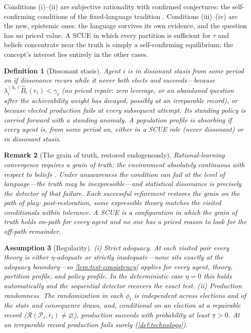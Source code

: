 \documentclass[11pt]{article}
\newtheorem{assumption}{Assumption}[section]
\newtheorem{definition}[assumption]{Definition}
\newtheorem{remark}[assumption]{Remark}
\theoremstyle{definition}
\newcommand{\emptysetset}{\varnothing}
\begin{document}
Conditions (i)--(ii) are subjective rationality with confirmed conjectures: the self-confirming conditions of the fixed-language tradition \citep{FudenbergLevine1993,KalaiLehrer1993b}.
Conditions (iii)--(iv) are the new, epistemic ones: the language survives its own evidence, and the question has no priced value.
A SCUE in which every partition is sufficient for $\tau$ and beliefs concentrate near the truth is simply a self-confirming equilibrium; the concept's interest lies entirely in the other cases.

\begin{definition}[Dissonant stasis]
\label{def:stasis}
Agent $i$ is in \emph{dissonant stasis} from some period on if dissonance recurs while it never both elects and succeeds---because $\lambda_i^{(k_i)}\widehat B_i(r_i)<\gamma_i$ (no priced repair: zero leverage, or an abandoned question after the achievability weight has decayed, possibly at an irreparable record), or because elected production fails at every subsequent attempt.
Its standing policy is carried forward with a standing anomaly.
A population profile is \emph{absorbing} if every agent is, from some period on, either in a SCUE role (never dissonant) or in dissonant stasis.
\end{definition}

\begin{remark}[The grain of truth, restored endogenously]
\label{rem:grain}
Rational-learning convergence requires a grain of truth: the environment absolutely continuous with respect to beliefs \citep{KalaiLehrer1993a}.
Under unawareness the condition can fail at the level of language---the truth may be inexpressible---and statistical dissonance is precisely the detector of that failure.
Each successful refinement restores the grain \emph{on the path of play}: post-restoration, some expressible theory matches the visited conditionals within tolerance.
A SCUE is a configuration in which the grain of truth holds on-path for every agent and no one has a priced reason to look for the off-path remainder.
\end{remark}

\begin{assumption}[Regularity]
\label{ass:regularity}
(i) \emph{Strict adequacy.}
At each visited pair every theory is either $\eta$-adequate or strictly inadequate---none sits exactly at the adequacy boundary---so \cref{lem:test-consistency} applies for every agent, theory, partition profile, and policy profile.
In the deterministic case $\eta=0$ this holds automatically and the sequential detector recovers the exact test.
(ii) \emph{Production randomness.}
The randomization in each $\phi_i$ is independent across elections and of the state and consequence draws, and, conditional on an election at a \emph{repairable} record ($\mathcal R(\mathcal P_i,\bar r_i)\neq\emptysetset$), production succeeds with probability at least $\underline\pi>0$.
At an irreparable record production fails surely (\cref{def:technology}).
\end{assumption}
\end{document}
